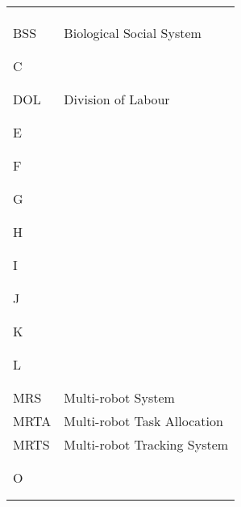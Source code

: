 \begin{tabular}{ll}
 
 &  \\  
 &  \\ 
 &  \\ 
 BSS &  Biological Social System\\ 
 &  \\ 
 &  \\ 
 C &  \\ 
 &  \\ 
 &  \\ 
 DOL &  Division of Labour\\ 
 &  \\ 
 &  \\ 
 E &  \\ 
 &  \\ 
 &  \\ 
 F &  \\ 
 &  \\ 
 &  \\ 
 G &  \\ 
 &  \\ 
 &  \\ 
 H &  \\ 
 &  \\ 
 &  \\ 
 I &  \\ 
 &  \\ 
 &  \\ 
 J &  \\ 
 &  \\ 
 &  \\ 
 K &  \\ 
 &  \\ 
 &  \\ 
 L &  \\ 
 &  \\ 
 &  \\ 
 MRS &  Multi-robot System\\ 
 MRTA &  Multi-robot Task Allocation\\
 MRTS & Multi-robot Tracking System 
 &  \\ 
 &  \\ 
 &  \\ 
 O &  \\ 
 &  \\ 
 &  \\ 

\end{tabular}
